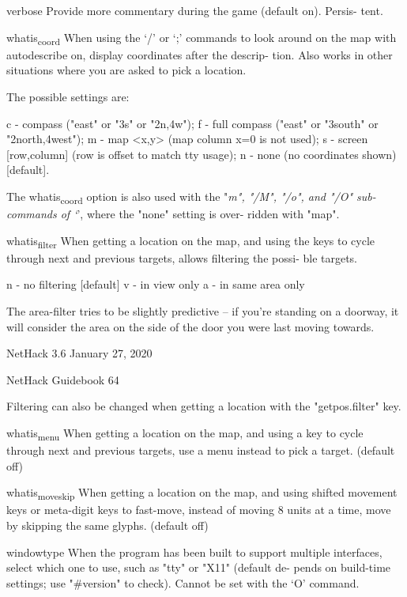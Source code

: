 \documentclass[11pt]{article}
\begin{document}
verbose
 Provide more commentary during the game (default on).  Persis-
 tent.

whatis\textsubscript{coord}
 When using the `/' or `;' commands to look around on the map
 with autodescribe on, display coordinates after the descrip-
 tion.  Also works in other situations where you are asked to
 pick a location.

The possible settings are:

c - compass ("east" or "3s" or "2n,4w");
f - full compass ("east" or "3south" or "2north,4west");
m - map <x,y> (map column x=0 is not used);
s - screen [row,column] (row is offset to match tty usage);
n - none (no coordinates shown) [default].

The whatis\textsubscript{coord} option is also used with the "\emph{m", "/M", "/o",
and "/O" sub-commands of `}', where the "none" setting is over-
ridden with "map".

whatis\textsubscript{filter}
 When getting a location on the map, and using the keys to cycle
 through next and previous targets, allows filtering the possi-
 ble targets.

n - no filtering [default]
v - in view only
a - in same area only

The area-filter tries to be slightly predictive -- if you're
standing on a doorway, it will consider the area on the side of
the door you were last moving towards.




NetHack 3.6                   January 27, 2020





NetHack Guidebook                       64



Filtering can also be changed when getting a location with the
"getpos.filter" key.

whatis\textsubscript{menu}
 When getting a location on the map, and using a key to cycle
 through next and previous targets, use a menu instead to pick a
 target. (default off)

whatis\textsubscript{moveskip}
 When getting a location on the map, and using shifted movement
 keys or meta-digit keys to fast-move, instead of moving 8 units
 at a time, move by skipping the same glyphs. (default off)

windowtype
 When the program has been built to support multiple interfaces,
 select which one to use, such as "tty" or "X11" (default de-
 pends on build-time settings; use "\#version" to check). Cannot
 be set with the `O' command.
\end{document}
